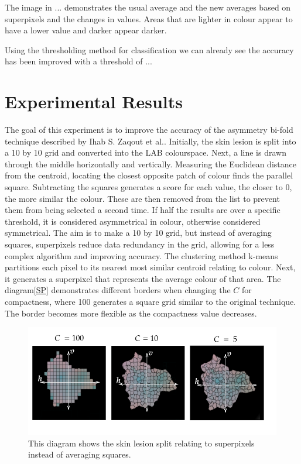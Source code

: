 The image in ... demonstrates the usual average and the new averages based on superpixels and the changes in values. Areas that are lighter in colour appear to have a lower value and darker appear darker.

Using the thresholding method for classification we can already see the accuracy has been improved with a threshold of ...

\section{Experimental Results}
The goal of this experiment is to improve the accuracy of the asymmetry bi-fold technique described by Ihab S. Zaqout et al.\cite{Zaqout2016}. Initially, the skin lesion is split into a 10 by 10 grid and converted into the LAB colourspace. Next, a line is drawn through the middle horizontally and vertically. Measuring the Euclidean distance from the centroid, locating the closest opposite patch of colour finds the parallel square. Subtracting the squares generates a score for each value, the closer to 0, the more similar the colour. These are then removed from the list to prevent them from being selected a second time. If half the results are over a specific threshold, it is considered asymmetrical in colour, otherwise considered symmetrical. The aim is to make a 10 by 10 grid, but instead of averaging squares, superpixels reduce data redundancy in the grid, allowing for a less complex algorithm and improving accuracy. The clustering method k-means partitions each pixel to its nearest most similar centroid relating to colour. Next, it generates a superpixel that represents the average colour of that area. The diagram\ref{SP} demonstrates different borders when changing the $C$ for compactness, where 100 generates a square grid similar to the original technique. The border becomes more flexible as the compactness value decreases.

\begin{figure} 
\centering
\includegraphics[scale=0.6]{images/superpixels.png}
\caption{This diagram shows the skin lesion split relating to superpixels instead of averaging squares.}
\end{figure}\label{SP}

